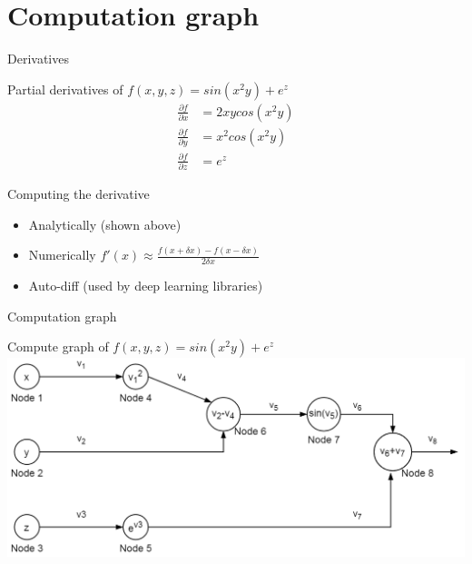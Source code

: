 \section{Computation graph}
\begin{frame}{Derivatives} 
	\begin{block}{ Partial derivatives of $f(x,y,z)= sin(x^2y)+e^z$}
		\begin{align}
			\frac{\partial f}{\partial x} &= 2xycos(x^2y) \\
			\frac{\partial f}{\partial y} &= x^2cos(x^2y) \\
			\frac{\partial f}{\partial z} &= e^z 
		\end{align}
	\end{block}
	Computing the derivative
		\begin{itemize}
			\item Analytically (shown above)
			\item Numerically $f'(x) \approx \frac{f(x+\delta x) - f(x-\delta x)}{2\delta x}$
			\item Auto-diff (used by deep learning libraries)
		\end{itemize}
\end{frame} 

\begin{frame}{Computation graph}
	\begin{block}{ Compute graph of $f(x,y,z)= sin(x^2y)+e^z$}
		\includegraphics[width=1.\textwidth, center]{figuras/backprop_eg1.png}
	\end{block}
\end{frame}

